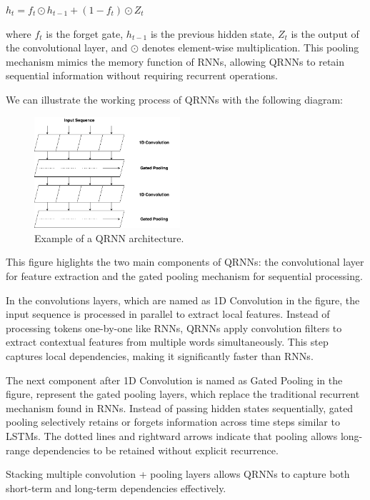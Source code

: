 \documentclass[10pt]{article}
\begin{document}
\begin{description}
\begin{center}
    $h_t = f_t \odot h_{t-1} + (1 - f_t) \odot Z_t$
\end{center}

where $f_t$ is the forget gate, $h_{t-1}$ is the previous hidden state, $Z_t$ is the output of the convolutional layer, and $\odot$ denotes element-wise multiplication.
This pooling mechanism mimics the memory function of RNNs, allowing QRNNs to retain sequential information without requiring recurrent operations.

We can illustrate the working process of QRNNs with the following diagram:

\begin{figure}[h]
    \centering
    \includegraphics[width=0.48\textwidth]{QRNN_figure.png}
    \caption{Example of a QRNN architecture.}
\end{figure}

This figure higlights the two main components of QRNNs: the convolutional layer for feature extraction and the gated pooling mechanism for sequential processing.

In the convolutions layers, which are named as 1D Convolution in the figure, the input sequence is processed in parallel to extract local features.
Instead of processing tokens one-by-one like RNNs, QRNNs apply convolution filters to extract contextual features from multiple words simultaneously.
This step captures local dependencies, making it significantly faster than RNNs.

The next component after 1D Convolution is named as Gated Pooling in the figure, represent the gated pooling layers, which replace the traditional recurrent mechanism found in RNNs.
Instead of passing hidden states sequentially, gated pooling selectively retains or forgets information across time steps similar to LSTMs.
The dotted lines and rightward arrows indicate that pooling allows long-range dependencies to be retained without explicit recurrence.

Stacking multiple convolution + pooling layers allows QRNNs to capture both short-term and long-term dependencies effectively.


\end{description}
\end{document}
